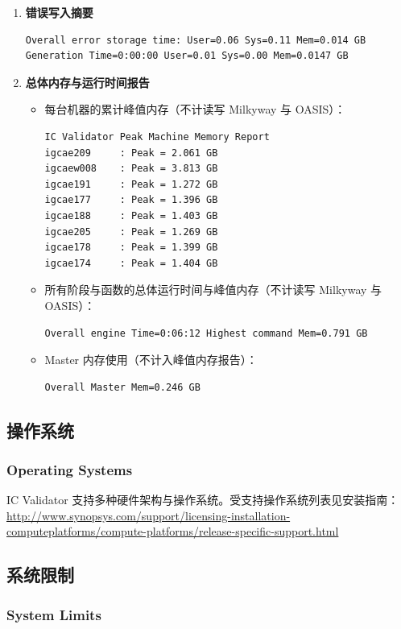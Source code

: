 \begin{enumerate}
  \item \textbf{错误写入摘要}
\begin{lstlisting}
Overall error storage time: User=0.06 Sys=0.11 Mem=0.014 GB
Generation Time=0:00:00 User=0.01 Sys=0.00 Mem=0.0147 GB
\end{lstlisting}

  \item \textbf{总体内存与运行时间报告}
  \begin{itemize}
    \item 每台机器的累计峰值内存（不计读写 Milkyway 与 OASIS）：
\begin{lstlisting}
IC Validator Peak Machine Memory Report
igcae209     : Peak = 2.061 GB
igcaew008    : Peak = 3.813 GB
igcae191     : Peak = 1.272 GB
igcae177     : Peak = 1.396 GB
igcae188     : Peak = 1.403 GB
igcae205     : Peak = 1.269 GB
igcae178     : Peak = 1.399 GB
igcae174     : Peak = 1.404 GB
\end{lstlisting}
    \item 所有阶段与函数的总体运行时间与峰值内存（不计读写 Milkyway 与 OASIS）：
\begin{lstlisting}
Overall engine Time=0:06:12 Highest command Mem=0.791 GB
\end{lstlisting}
    \item Master 内存使用（不计入峰值内存报告）：
\begin{lstlisting}
Overall Master Mem=0.246 GB
\end{lstlisting}
  \end{itemize}
\end{enumerate}

\subsection{操作系统}
\subsubsection*{Operating Systems}

IC Validator 支持多种硬件架构与操作系统。受支持操作系统列表见安装指南：\\
\url{http://www.synopsys.com/support/licensing-installation-computeplatforms/compute-platforms/release-specific-support.html}

\subsection{系统限制}
\subsubsection*{System Limits}

